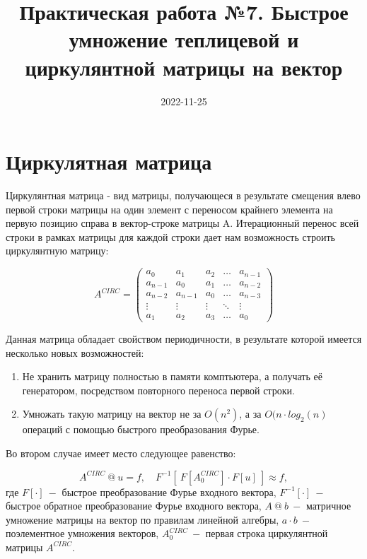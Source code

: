 \documentclass[
]{article}
\title{Практическая работа №7. Быстрое умножение теплицевой и
циркулянтной матрицы на вектор}
\author{}
\date{\vspace{-2.5em}2022-11-25}
\begin{document}
\maketitle

\hypertarget{ux446ux438ux440ux43aux443ux43bux44fux442ux43dux430ux44f-ux43cux430ux442ux440ux438ux446ux430}{%
\section{\texorpdfstring{\textbf{Циркулятная
матрица}}{Циркулятная матрица}}\label{ux446ux438ux440ux43aux443ux43bux44fux442ux43dux430ux44f-ux43cux430ux442ux440ux438ux446ux430}}

Циркулянтная матрица - вид матрицы, получающеся в результате смещения
влево первой строки матрицы на один элемент с переносом крайнего
элемента на первую позицию справа в вектор-строке матрицы A.
Итерационный перенос всей строки в рамках матрицы для каждой строки дает
нам возможность строить циркулянтную матрицу:

\[
A^{CIRC} = \begin{pmatrix} a_0 & a_1 & a_2 & \dots & a_{n-1} \\
a_{n-1} & a_0 & a_1 & \dots & a_{n-2} \\ 
a_{n-2} & a_{n-1} & a_0 & \dots & a_{n-3} \\
\vdots & \vdots & \vdots & \ddots & \vdots \\
a_1 & a_2 & a_3 & \dots & a_{0}
\end{pmatrix}
\]

Данная матрица обладает свойством периодичности, в результате которой
имеется несколько новых возможностей:

\begin{enumerate}
\def\labelenumi{\arabic{enumi}.}
\item
  Не хранить матрицу полностью в памяти комптьютера, а получать её
  генератором, посредством повторного переноса первой строки.
\item
  Умножать такую матрицу на вектор не за \(O(n^2)\), а за
  \(O(n\cdot log_2(n)\) операций с помощью быстрого преобразования
  Фурье.
\end{enumerate}

Во втором случае имеет место следующее равенство:

\[
A^{CIRC} \ @ \ u = f,\quad F^{-1}\left[\ F[A^{CIRC}_{0}] \cdot F[u]\ \right] \approx f,
\] где \(F[\cdot]\ -\) быстрое преобразование Фурье входного вектора,
\(F^{-1}[\cdot]\ -\) быстрое обратное преобразование Фурье входного
вектора, \(A \ @ \ b\ -\) матричное умножение матрицы на вектор по
правилам линейной алгебры, \(a \cdot b\ -\) поэлементное умножения
векторов, \(A^{CIRC}_{0}\ -\) первая строка циркулянтной матрицы
\(A^{CIRC}\).
\end{document}
